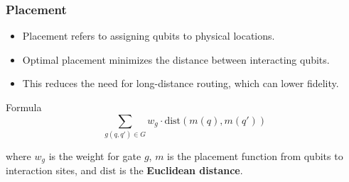 \documentclass[18 pt]{beamer}
\begin{document}
\begin{frame}
    \frametitle{Placement}
    \begin{itemize}
        \item Placement refers to assigning qubits to physical locations.
        \item Optimal placement minimizes the distance between interacting qubits.
        \item This reduces the need for long-distance routing, which can lower fidelity.
    \end{itemize}
    \begin{block}{Formula}
        \[
        \sum_{g(q,q') \in G} w_g \cdot \text{dist}(m(q), m(q'))
        \]
        
        where \( w_g \) is the weight for gate \( g \), \( m \) is the placement function from qubits to interaction sites, and \(\text{dist}\) is the \textbf{Euclidean distance}.
    \end{block}
\end{frame}
\end{document}
